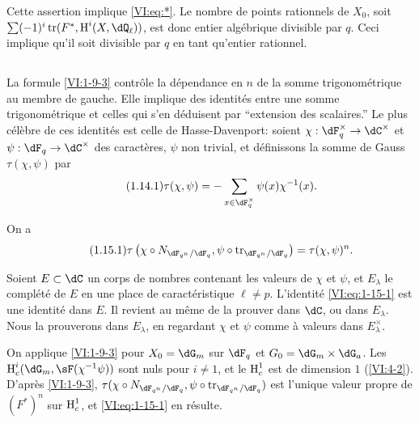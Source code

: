 Cette assertion implique \eqref{VI:eq:*}. Le nombre de points rationnels de 
$X_0$, soit $\sum (-1)^i \tr(F^\ast,\h^i(X,\dQ_\ell))$, est donc entier 
algébrique divisible par $q$. Ceci implique qu'il soit divisible par $q$ en 
tant qu'entier rationnel. 





\subsection{}\label{VI:1-14}

La formule \ref{VI:1-9-3} contrôle la dépendance en $n$ de la somme 
trigonométrique au membre de gauche. Elle implique des identités entre une 
somme trigonométrique et celles qui s'en déduisent par ``extension des 
scalaires.'' Le plus célèbre de ces identités est celle de 
Hasse-Davenport: soient $\chi:\dF_q^\times \to \dC^\times$ et 
$\psi:\dF_q\to \dC^\times$ des caractères, $\psi$ non trivial, et 
définissons la somme de Gauss $\tau(\chi,\psi)$ par 
\begin{equation*}\tag{1.14.1}\label{VI:eq:1-14-1}
  \tau(\chi,\psi) = - \sum_{x\in \dF_q^\times} \psi(x) \chi^{-1}(x) \text{.}
\end{equation*}





\begin{theorem_}\label{VI:1-15}
On a 
\begin{equation*}\tag{1.15.1}\label{VI:eq:1-15-1}
  \tau\left(\chi\circ N_{\dF_{q^n}/\dF_q},\psi\circ \tr_{\dF_{q^n}/\dF_q}\right) = \tau(\chi,\psi)^n \text{.}
\end{equation*}
\end{theorem_}

Soient $E\subset \dC$ un corps de nombres contenant les valeurs de $\chi$ et 
$\psi$, et $E_\lambda$ le complété de $E$ en une place de caractéristique 
$\ell\ne p$. L'identité \eqref{VI:eq:1-15-1} est une identité dans $E$. Il 
revient au même de la prouver dans $\dC$, ou dans $E_\lambda$. Nous la 
prouverons dans $E_\lambda$, en regardant $\chi$ et $\psi$ comme à valeurs 
dans $E_\lambda^\times$. 

On applique \ref{VI:1-9-3} pour $X_0=\dG_m$ sur $\dF_q$ et 
$G_0=\dG_m\times \dG_a$. Les $\h_c^i(\dG_m,\sF(\chi^{-1}\psi))$ sont nuls pour 
$i\ne 1$, et le $\operatorname{H}_c^1$ est de dimension $1$ (\ref{VI:4-2}). D'après 
\ref{VI:1-9-3}, 
$\tau(\chi\circ N_{\dF_{q^n}/\dF_q},\psi\circ \tr_{\dF_{q^n}/\dF_q})$ est 
l'unique valeur propre de $(F^\ast)^n$ sur $\operatorname{H}_c^1$, et \eqref{VI:eq:1-15-1} en 
résulte. 

